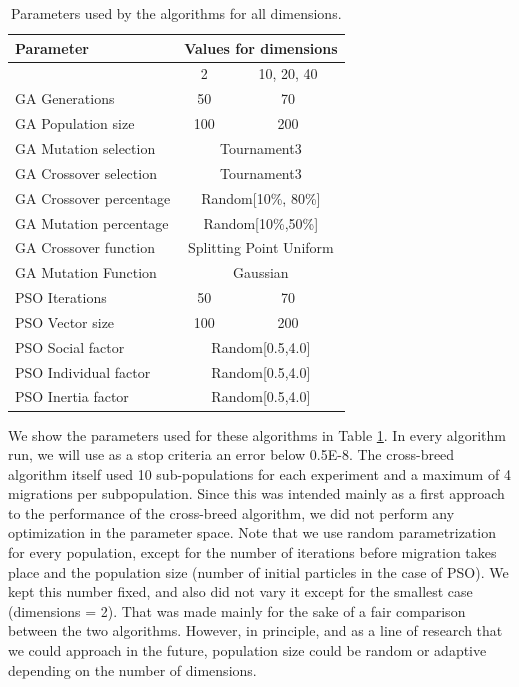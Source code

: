 \documentclass[runningheads]{llncs}
\begin{document}
   \begin{table}[h!tp]
    \caption{Parameters used by the algorithms for all dimensions.}
    \label{table:ga-pso-parameters}
    \centering
    \begin{tabular}{|l|c|c|}
    \hline
    Parameter & \multicolumn{2}{c|}{Values for dimensions} \\
      \hline
      & 2 & 10, 20, 40 \\
    \hline
    GA Generations & 50 &  70\\
    \hline
     GA Population size & 100 & 200\\
    \hline
    GA Mutation selection &  \multicolumn{2}{c|}{Tournament3}\\
    \hline
    GA Crossover selection & \multicolumn{2}{c|}{Tournament3} \\
    \hline
    GA Crossover percentage & \multicolumn{2}{c|}{Random[10\%, 80\%]} \\
    \hline
    GA Mutation percentage & \multicolumn{2}{c|}{Random[10\%,50\%]} \\
    \hline
    GA Crossover function & \multicolumn{2}{c|}{Splitting Point Uniform} \\
    \hline
    GA Mutation Function & \multicolumn{2}{c|}{Gaussian} \\
      \hline 
      \hline
    PSO Iterations & 50 & 70\\
    \hline
    PSO Vector size & 100 & 200\\
    \hline
    PSO Social factor & \multicolumn{2}{c|}{Random[0.5,4.0]} \\
    \hline
    PSO Individual factor & \multicolumn{2}{c|}{Random[0.5,4.0]} \\
    \hline
    PSO Inertia factor & \multicolumn{2}{c|}{Random[0.5,4.0]} \\
    \hline
    \end{tabular}
\end{table}

We show the parameters used for these algorithms in Table
\ref{table:ga-pso-parameters}. In every algorithm run, we will use as a stop
criteria an error below 0.5E-8. The cross-breed algorithm itself used 10
sub-populations for each experiment and a maximum of 4 migrations per
subpopulation. Since this was intended mainly as a first approach to the
performance of the cross-breed algorithm, we did not perform any optimization in
the parameter space. Note that we use random parametrization for every
population, except for the number of iterations before migration takes place and
the population size (number of initial particles in the case of PSO). 
We kept this number fixed, and also did not vary it except for the smallest case
(dimensions = 2). That was made mainly for the sake of a fair
comparison between the two algorithms. However, in principle, and as a line of
research that we could approach in the future, population size could be
random or adaptive depending on the number of dimensions.
\end{document}
